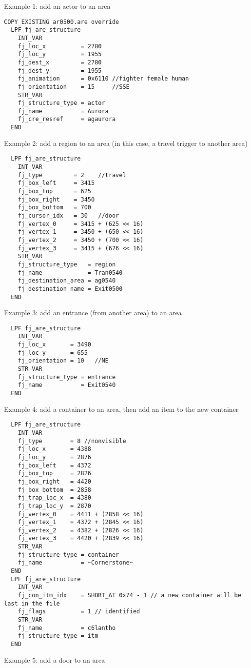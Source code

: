 \documentclass{article}
\begin{document}
Example 1: add an actor to an area
\begin{verbatim}
COPY_EXISTING ar0500.are override
  LPF fj_are_structure
    INT_VAR
    fj_loc_x          = 2780
    fj_loc_y          = 1955
    fj_dest_x         = 2780
    fj_dest_y         = 1955
    fj_animation      = 0x6110 //fighter female human
    fj_orientation    = 15     //SSE
    STR_VAR
    fj_structure_type = actor
    fj_name           = Aurora
    fj_cre_resref     = agaurora
  END
\end{verbatim}
Example 2: add a region to an area (in this case, a travel trigger to another area)
\begin{verbatim}
  LPF fj_are_structure
    INT_VAR
    fj_type         = 2    //travel
    fj_box_left     = 3415
    fj_box_top      = 625
    fj_box_right    = 3450
    fj_box_bottom   = 700
    fj_cursor_idx   = 30   //door
    fj_vertex_0     = 3415 + (625 << 16)
    fj_vertex_1     = 3450 + (650 << 16)
    fj_vertex_2     = 3450 + (700 << 16)
    fj_vertex_3     = 3415 + (676 << 16)
    STR_VAR
    fj_structure_type   = region
    fj_name             = Tran0540
    fj_destination_area = ag0540
    fj_destination_name = Exit0500
  END
\end{verbatim}
Example 3: add an entrance (from another area) to an area
\begin{verbatim}
  LPF fj_are_structure
    INT_VAR
    fj_loc_x       = 3490
    fj_loc_y       = 655
    fj_orientation = 10   //NE
    STR_VAR
    fj_structure_type = entrance
    fj_name           = Exit0540
  END
\end{verbatim}
Example 4: add a container to an area, then add an item to the new container
\begin{verbatim}
  LPF fj_are_structure
    INT_VAR
    fj_type        = 8 //nonvisible
    fj_loc_x       = 4388
    fj_loc_y       = 2876
    fj_box_left    = 4372
    fj_box_top     = 2826
    fj_box_right   = 4420
    fj_box_bottom  = 2858
    fj_trap_loc_x  = 4380
    fj_trap_loc_y  = 2870
    fj_vertex_0    = 4411 + (2858 << 16)
    fj_vertex_1    = 4372 + (2845 << 16)
    fj_vertex_2    = 4382 + (2826 << 16)
    fj_vertex_3    = 4420 + (2839 << 16)
    STR_VAR
    fj_structure_type = container
    fj_name           = ~Cornerstone~
  END
  LPF fj_are_structure
    INT_VAR
    fj_con_itm_idx    = SHORT_AT 0x74 - 1 // a new container will be last in the file
    fj_flags          = 1 // identified
    STR_VAR
    fj_name           = c6lantho
    fj_structure_type = itm
  END
\end{verbatim}
Example 5: add a door to an area
\end{document}
